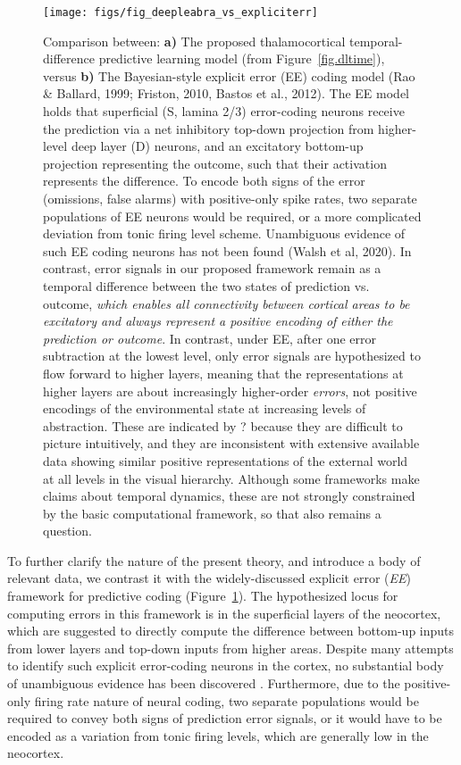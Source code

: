 \documentclass[11pt,twoside]{article}
\newif\myifpdf
\begin{document}
\begin{figure}
  \centering\texttt{[image: figs/fig\_deepleabra\_vs\_expliciterr]}
  \caption{\footnotesize Comparison between: {\bf a)} The proposed thalamocortical temporal-difference predictive learning model (from Figure~\ref{fig.dltime}), versus {\bf b)} The Bayesian-style explicit error (EE) coding model (Rao \& Ballard, 1999; Friston, 2010, Bastos et al., 2012).  The EE model holds that superficial (S, lamina 2/3) error-coding neurons receive the prediction via a net inhibitory top-down projection from higher-level deep layer (D) neurons, and an excitatory bottom-up projection representing the outcome, such that their activation represents the difference.  To encode both signs of the error (omissions, false alarms) with positive-only spike rates, two separate populations of EE neurons would be required, or a more complicated deviation from tonic firing level scheme.  Unambiguous evidence of such EE coding neurons has not been found (Walsh et al, 2020).  In contrast, error signals in our proposed framework remain as a temporal difference between the two states of prediction vs. outcome, \emph{which enables all connectivity between cortical areas to be excitatory and always represent a positive encoding of either the prediction or outcome}.  In contrast, under EE, after one error subtraction at the lowest level, only error signals are hypothesized to flow forward to higher layers, meaning that the representations at higher layers are about increasingly higher-order \emph{errors}, not positive encodings of the environmental state at increasing levels of abstraction.  These are indicated by ? because they are difficult to picture intuitively, and they are inconsistent with extensive available data showing similar positive representations of the external world at all levels in the visual hierarchy.  Although some frameworks make claims about temporal dynamics, these are not strongly constrained by the basic computational framework, so that also remains a question.}
  \label{fig.ee}
\end{figure}

To further clarify the nature of the present theory, and introduce a body of relevant data, we contrast it with the widely-discussed explicit error (\emph{EE}) framework for predictive coding \citep{RaoBallard99,KawatoHayakawaInui93,Friston05,Friston10,OudenKokLange12,BastosUsreyAdamsEtAl12,LotterKreimanCox16} (Figure~\ref{fig.ee}).  The hypothesized locus for computing errors in this framework is in the superficial layers of the neocortex, which are suggested to directly compute the difference between bottom-up inputs from lower layers and top-down inputs from higher areas.  Despite many attempts to identify such explicit error-coding neurons in the cortex, no substantial body of unambiguous evidence has been discovered \citep{KokLange15,KokJeheedeLange12,SummerfieldEgner09,LeeMumford03,WalshMcGovernClarkEtAl20}.  Furthermore, due to the positive-only firing rate nature of neural coding, two separate populations would be required to convey both signs of prediction error signals, or it would have to be encoded as a variation from tonic firing levels, which are generally low in the neocortex.
\end{document}
